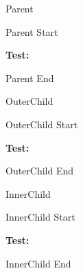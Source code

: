 \documentclass[12pt]{pnpprep}
\begin{document}




     \ExplSyntaxOn

    \begin{blueprint}{Parent}


        \begin{render}
            Parent Start\par
            \textbf{Test: }\testvalue\par
            \renderChildren
            Parent End\par
        \end{render}
    \end{blueprint}

    \begin{blueprint}{OuterChild}

        \begin{render}
            OuterChild Start\par
            \textbf{Test: }\testvalue\par
            \renderChildren
            OuterChild End\par
        \end{render}
    \end{blueprint}

    \begin{blueprint}{InnerChild}

        \begin{render}
            InnerChild Start\par
            \textbf{Test: }\testvalue\par
            \renderChildren
            InnerChild End\par
        \end{render}
    \end{blueprint}

    \begin{Parent}

        \begin{OuterChildWrapper}

            \begin{InnerChildWrapper}
            \end{InnerChildWrapper}
        \end{OuterChildWrapper}
    \end{Parent}
 \ExplSyntaxOff
\end{document}
